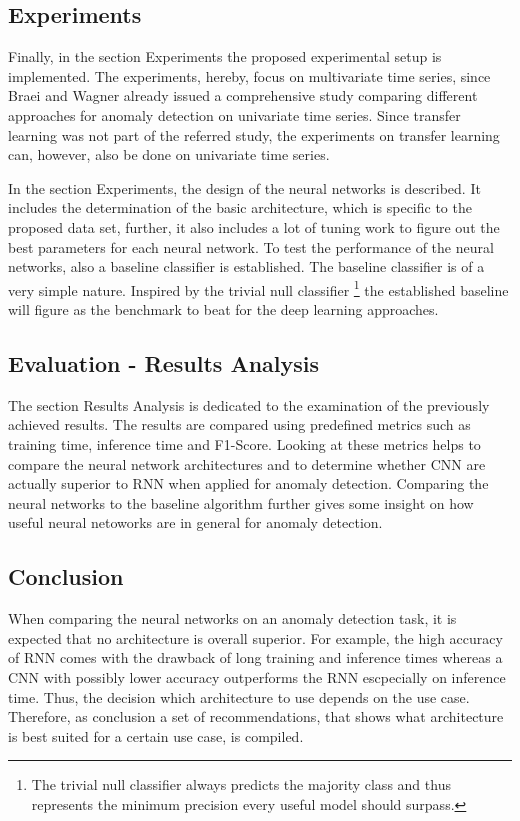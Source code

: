 \subsection{Experiments}
Finally, in the section Experiments the proposed experimental setup is implemented. The experiments, hereby, focus on multivariate time series, since Braei and Wagner \parencite*{Braei2020} already issued a comprehensive study comparing different approaches for anomaly detection on univariate time series. Since transfer learning was not part of the referred study, the experiments on transfer learning can, however, also be done on univariate time series. 

In the section Experiments, the design of the neural networks is described. It includes the determination of the basic architecture, which is specific to the proposed data set, further, it also includes a lot of tuning work to figure out the best parameters for each neural network. To test the performance of the neural networks, also a baseline classifier is established. The baseline classifier is of a very simple nature. Inspired by the trivial null classifier \footnote{The trivial null classifier always predicts the majority class and thus represents the minimum precision every useful model should surpass.} the established baseline will figure as the benchmark to beat for the deep learning approaches. 

\subsection{Evaluation - Results Analysis}
The section Results Analysis is dedicated to the examination of the previously achieved results. The results are compared using predefined metrics such as training time, inference time and F1-Score. Looking at these metrics helps to compare the neural network architectures and to determine whether CNN are actually superior to RNN when applied for anomaly detection. Comparing the neural networks to the baseline algorithm further gives some insight on how useful neural netoworks are in general for anomaly detection.

\subsection{Conclusion}
When comparing the neural networks on an anomaly detection task, it is expected that no architecture is overall superior. For example, the high accuracy of RNN comes with the drawback of long training and inference times whereas a CNN with possibly lower accuracy outperforms the RNN escpecially on inference time. Thus, the decision which architecture to use depends on the use case. Therefore, as conclusion a set of recommendations, that shows what architecture is best suited for a certain use case, is compiled.


